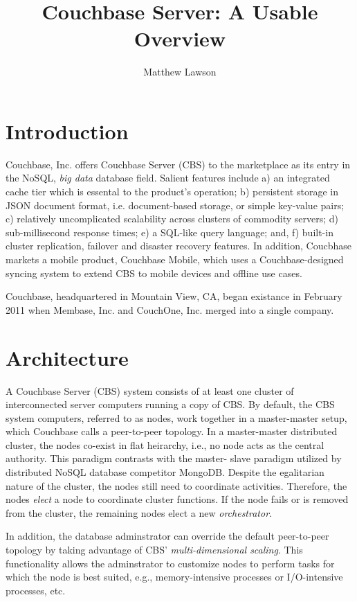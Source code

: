 \documentclass[9pt,twocolumn,twoside]{styles/osajnl}
\title{Couchbase Server: A Usable Overview}
\author[1]{Matthew Lawson}
\affil[1]{School of Informatics and Computing, Bloomington, IN 47408, U.S.A.}
\affil[*]{Corresponding authors: laszewski@gmail.com}
\begin{document}
\maketitle

\section{Introduction}

Couchbase, Inc. offers Couchbase Server (CBS) to the marketplace as its entry in the NoSQL, \textit{big data} database field.  Salient features include a) an integrated cache tier which is essental to the product's operation; b) persistent storage in JSON document format, i.e. document-based storage, or simple key-value pairs; c) relatively uncomplicated scalability across clusters of commodity servers; d) sub-millisecond response times; e) a SQL-like query language; and, f) built-in cluster replication, failover and disaster recovery features.  In addition, Coucbhase markets a mobile product, Couchbase Mobile, which uses a Couchbase-designed syncing system to extend CBS to mobile devices and offline use cases.

Couchbase, headquartered in Mountain View, CA, began existance in February 2011 when Membase, Inc. and CouchOne, Inc. merged into a single company.

\section{Architecture} 

A Couchbase Server (CBS) system consists of at
least one cluster of interconnected server computers running a copy of CBS. By
default, the CBS system computers, referred to as nodes, work together in a
master-master setup, which Couchbase calls a peer-to-peer topology.  In a
master-master distributed cluster, the nodes co-exist in flat heirarchy, i.e.,
no node acts as the central authority.  This paradigm contrasts with the master-
slave paradigm utilized by distributed NoSQL database competitor MongoDB.
Despite the egalitarian nature of the cluster, the nodes still need to
coordinate activities.  Therefore, the nodes \textit{elect} a node to coordinate
cluster functions. If the node fails or is removed from the cluster, the
remaining  nodes elect a new \textit{orchestrator}.

In addition, the database adminstrator can override the default peer-to-peer
topology by taking advantage of CBS' \textit{multi-dimensional scaling}.  This
functionality allows the adminstrator to customize nodes to perform tasks for
which the node is best suited, e.g., memory-intensive processes or
I/O-intensive processes, etc.
\end{document}
